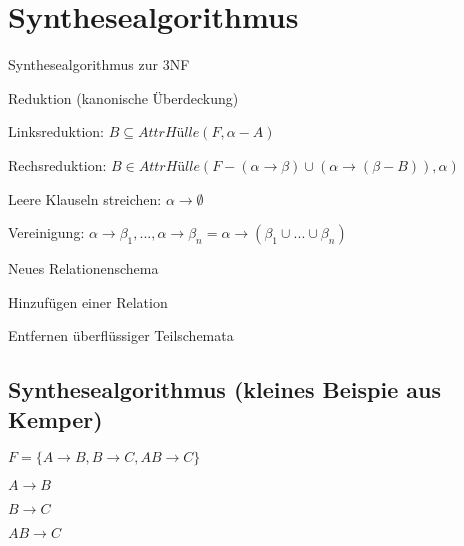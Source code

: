 \documentclass{lehramt-informatik}
\begin{document}
\chapter{Synthesealgorithmus}

\begin{lernkartei}{Synthesealgorithmus zur 3NF}

\begin{compactenum}
\item Reduktion (kanonische Überdeckung)

\begin{compactenum}
\item Linksreduktion:
$B \subseteq \textit{AttrHülle}(F, \alpha - A)$

\item Rechsreduktion:
$B \in \textit{AttrHülle}(F - (\alpha \rightarrow \beta) \cup (\alpha \rightarrow (\beta - B)), \alpha)$

\item Leere Klauseln streichen:
$\alpha \rightarrow \emptyset$

\item Vereinigung:
$\alpha \rightarrow \beta_1,...,\alpha \rightarrow \beta_n  = \alpha \rightarrow (\beta_1 \cup ... \cup \beta_n)$
\end{compactenum}

\item Neues Relationenschema
\item Hinzufügen einer Relation
\item Entfernen überflüssiger Teilschemata
\end{compactenum}
\end{lernkartei}

%

\section{Synthesealgorithmus (kleines Beispie aus Kemper)}

\cite[Seite 186]{kemper}

$F = \{A \rightarrow B, B \rightarrow C, AB \rightarrow C\}$

\begin{compactitem}
\item $A \rightarrow B$
\item $B \rightarrow C$
\item $AB \rightarrow C$
\end{compactitem}
\end{document}
